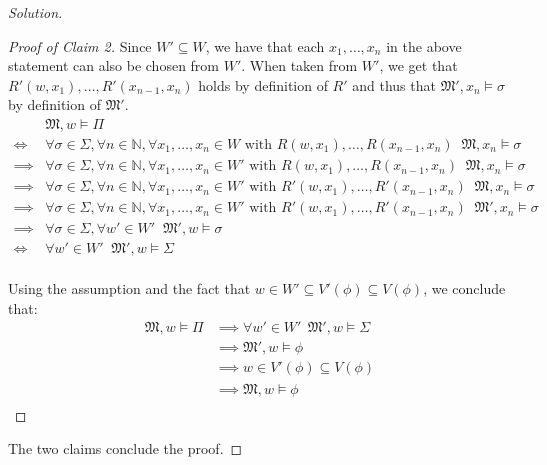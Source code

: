 \documentclass[12pt,a4paper]{report}
\theoremstyle{definition}
\newcommand{\N}{\mathbb{N}}                     %
\newcommand{\model}[1]{\mathfrak{#1}}           %
\begin{document}
\begin{proof}[Solution]
\begin{proof}[Proof of Claim 2]
            Since $W' \subseteq W$, we have that each $x_1, \ldots, x_n$ in the above statement can also be chosen from $W'$. When taken from $W'$, we get that $R'(w, x_1), \ldots, R'(x_{n-1}, x_n)$ holds by definition of $R'$ and thus that $\model M', x_n \models \sigma$ by definition of $\model M'$.
            \[\begin{split}
                & \model M, w \models \Pi \\
                \iff & \forall \sigma \in \Sigma, \forall n \in \N, \forall x_1, \ldots, x_n \in W  \text{ with } R(w, x_1), \ldots, R(x_{n-1}, x_n)\;\; \model M, x_n \models \sigma \\
                \implies & \forall \sigma \in \Sigma, \forall n \in \N, \forall x_1, \ldots, x_n \in W'  \text{ with } R(w, x_1), \ldots, R(x_{n-1}, x_n)\;\; \model M, x_n \models \sigma \\
                \implies & \forall \sigma \in \Sigma, \forall n \in \N, \forall x_1, \ldots, x_n \in W'  \text{ with } R'(w, x_1), \ldots, R'(x_{n-1}, x_n)\;\; \model M, x_n \models \sigma \\
                \implies & \forall \sigma \in \Sigma, \forall n \in \N, \forall x_1, \ldots, x_n \in W'  \text{ with } R'(w, x_1), \ldots, R'(x_{n-1}, x_n)\;\; \model M', x_n \models \sigma \\
                \implies & \forall \sigma \in \Sigma, \forall w' \in W' \;\; \model M', w \models \sigma \\
                \iff & \forall w' \in W' \;\; \model M', w \models \Sigma \\
            \end{split}\]

            Using the assumption and the fact that $w \in W' \subseteq V'(\phi) \subseteq V(\phi)$, we conclude that:
            \[\begin{split}
                \model M, w \models \Pi &\implies \forall w' \in W' \,\; \model M', w \models \Sigma \\
                & \implies \model M', w \models \phi \\
                & \implies w \in V'(\phi) \subseteq V(\phi)\\
                & \implies \model M, w \models \phi\\
            \end{split}\]
        \end{proof}

        The two claims conclude the proof.
    \end{proof}
\end{document}
